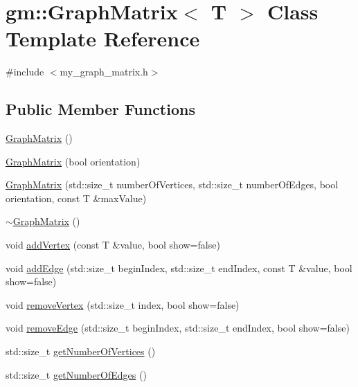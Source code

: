 \hypertarget{classgm_1_1_graph_matrix}{}\section{gm\+:\+:Graph\+Matrix$<$ T $>$ Class Template Reference}
\label{classgm_1_1_graph_matrix}


{\ttfamily \#include $<$my\+\_\+graph\+\_\+matrix.\+h$>$}

\subsection*{Public Member Functions}
\begin{DoxyCompactItemize}
\item 
\mbox{\hyperlink{classgm_1_1_graph_matrix_a8f4f156e67d7425f1cc5784384a83757}{Graph\+Matrix}} ()
\item 
\mbox{\hyperlink{classgm_1_1_graph_matrix_a24ab316e39e3a26c9208c81af0e3e48d}{Graph\+Matrix}} (bool orientation)
\item 
\mbox{\hyperlink{classgm_1_1_graph_matrix_a091be187f54bd8fc750696c4e97e9552}{Graph\+Matrix}} (std\+::size\+\_\+t number\+Of\+Vertices, std\+::size\+\_\+t number\+Of\+Edges, bool orientation, const T \&max\+Value)
\item 
\mbox{\hyperlink{classgm_1_1_graph_matrix_a3b0993020ce3351d0ec4b7fe2adc2580}{$\sim$\+Graph\+Matrix}} ()
\item 
void \mbox{\hyperlink{classgm_1_1_graph_matrix_a300259b6a1b30f01d5084b48b22a83b8}{add\+Vertex}} (const T \&value, bool show=false)
\item 
void \mbox{\hyperlink{classgm_1_1_graph_matrix_a0500fe2b6a585690c33ca4ee182cbdea}{add\+Edge}} (std\+::size\+\_\+t begin\+Index, std\+::size\+\_\+t end\+Index, const T \&value, bool show=false)
\item 
void \mbox{\hyperlink{classgm_1_1_graph_matrix_a43883f2cb97bc0286809be6fc8972838}{remove\+Vertex}} (std\+::size\+\_\+t index, bool show=false)
\item 
void \mbox{\hyperlink{classgm_1_1_graph_matrix_aaee8cb1c4d2bab6fcba5f3fc64852bfd}{remove\+Edge}} (std\+::size\+\_\+t begin\+Index, std\+::size\+\_\+t end\+Index, bool show=false)
\item 
std\+::size\+\_\+t \mbox{\hyperlink{classgm_1_1_graph_matrix_a4efd9cd32511a16462cbbb22f9a5c37b}{get\+Number\+Of\+Vertices}} ()
\item 
std\+::size\+\_\+t \mbox{\hyperlink{classgm_1_1_graph_matrix_a4c240da5b6fb8ca0f0b65b179fcddf60}{get\+Number\+Of\+Edges}} ()

\end{DoxyCompactItemize}
